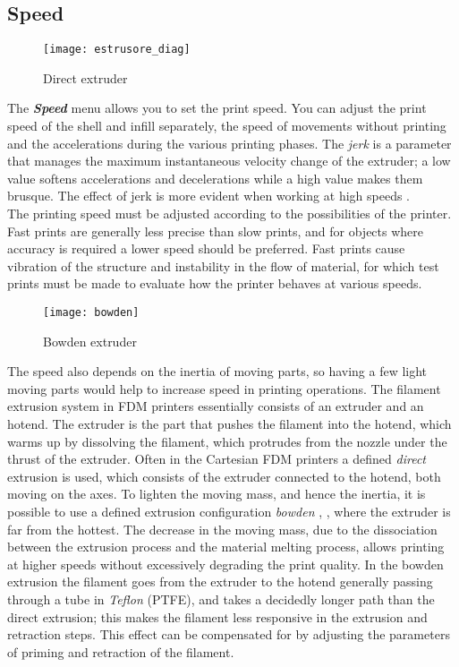 \subsection{Speed}
\begin{wrapfigure}{R}{0.4\textwidth}
\vspace{-20pt}
\texttt{[image: estrusore\_diag]}
    \caption{Direct extruder}
    \label{fig: estrusore_diag}
\end{wrapfigure}
The \emph{\textbf{Speed}} menu allows you to set the print speed. You can adjust the print speed of the shell and infill separately, the speed of movements without printing and the accelerations during the various printing phases.
The \emph{jerk} is a parameter that manages the maximum instantaneous velocity change of the extruder; a low value softens accelerations and decelerations while a high value makes them brusque. The effect of jerk is more evident when working at high speeds \parencite{Reference53}. \\
The printing speed must be adjusted according to the possibilities of the printer. Fast prints are generally less precise than slow prints, and for objects where accuracy is required a lower speed should be preferred. Fast prints cause vibration of the structure and instability in the flow of material, for which test prints must be made to evaluate how the printer behaves at various speeds.
\begin{wrapfigure} {R} {0.4\textwidth}
	\texttt{[image: bowden]}
    \caption{Bowden extruder}
    \label{fig:bowden}
\end{wrapfigure}

The speed also depends on the inertia of moving parts, so having a few light moving parts would help to increase speed in printing operations.
The filament extrusion system in FDM printers essentially consists of an extruder and an hotend. The extruder is the part that pushes the filament into the hotend, which warms up by dissolving the filament, which protrudes from the nozzle under the thrust of the extruder. Often in the Cartesian FDM printers a defined \emph{direct} extrusion is used, which consists of the extruder connected to the hotend, both moving on the axes.
To lighten the moving mass, and hence the inertia, it is possible to use a defined extrusion configuration \emph{bowden} \parencite{Reference54}, \parencite{Reference55}, where the extruder is far from the hottest. The decrease in the moving mass, due to the dissociation between the extrusion process and the material melting process, allows printing at higher speeds without excessively degrading the print quality. In the bowden extrusion the filament goes from the extruder to the hotend generally passing through a tube in \emph{Teflon} (PTFE), and takes a decidedly longer path than the direct extrusion; this makes the filament less responsive in the extrusion and retraction steps. This effect can be compensated for by adjusting the parameters of priming and retraction of the filament.

